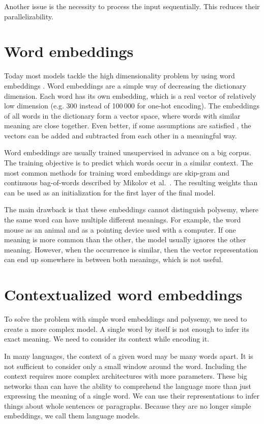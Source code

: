 \documentclass[
  printed, %
  color,   %
  table,   %
  oneside, %
  lof,     %
  lot,     %
]{fithesis3}
\begin{document}
Another issue is the necessity to process the input sequentially. This reduces their parallelizability. 

\section{Word embeddings}
Today most models tackle the high dimensionality problem by using word embeddings \parencite{mikolov}. Word embeddings are a simple way of decreasing the dictionary dimension. Each word has its own embedding, which is a real vector of relatively low dimension (e.g. 300 instead of 100\,000 for one-hot encoding). The embeddings of all words in the dictionary form a vector space, where words with similar meaning are close together. Even better, if some assumptions are satisfied \parencite{vectadd}, the vectors can be added and subtracted from each other in a meaningful way.  

Word embeddings are usually trained unsupervised in advance on a big corpus. The training objective is to predict which words occur in a similar context. The most common methods for training word embeddings are skip-gram and continuous bag-of-words described by Mikolov et al.~\parencite{mikolov}. The resulting weights than can be used as an initialization for the first layer of the final model.

The main drawback is that these embeddings cannot distinguish polysemy, where the same word can have multiple different meanings. For example, the word mouse as an animal and as a pointing device used with a computer. If one meaning is more common than the other, the model usually ignores the other meaning. However, when the occurrence is similar, then the vector representation can end up somewhere in between both meanings, which is not useful.

\section{Contextualized word embeddings}
To solve the problem with simple word embeddings and polysemy, we need to create a more complex model. A single word by itself is not enough to infer its exact meaning. We need to consider its context while encoding it. 

In many languages, the context of a given word may be many words apart. It is not sufficient to consider only a small window around the word. Including the context requires more complex architectures with more parameters. These big networks than can have the ability to comprehend the language more than just expressing the meaning of a single word. We can use their representations to infer things about whole sentences or paragraphs. Because they are no longer simple embeddings, we call them language models.
\end{document}
